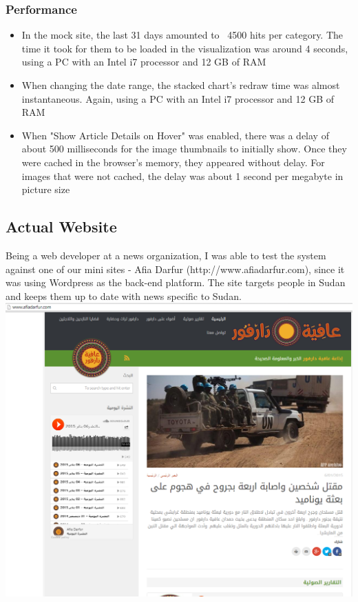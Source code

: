 \documentclass[12pt]{article}
\begin{document}
\subsubsection{Performance}
\begin{itemize}
\item In the mock site, the last 31 days amounted to ~4500 hits per category. The time it took for them to be loaded in the visualization was around 4 seconds, using a PC with an Intel i7 processor and 12 GB of RAM
\item When changing the date range, the stacked chart's redraw time was almost instantaneous. Again, using a PC with an Intel i7 processor and 12 GB of RAM
\item When "Show Article Details on Hover" was enabled, there was a delay of about 500 milliseconds for the image thumbnails to initially show. Once they were cached in the browser's memory, they appeared without delay. For images that were not cached, the delay was about 1 second per megabyte in picture size
\end{itemize}

\newpage

\subsection{Actual Website}
Being a web developer at a news organization, I was able to test the system against one of our mini sites - Afia Darfur (http://www.afiadarfur.com), since it was using Wordpress as the back-end platform. The site targets people in Sudan and keeps them up to date with news specific to Sudan. \\

\noindent\includegraphics[scale=0.4]{img/afiadarfur_main} \\
\end{document}
